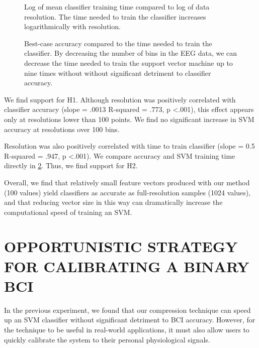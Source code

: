  \begin{figure}[!h]
  \vspace{-0.2cm}
  \centering
   {}
  \caption{Log of mean classifier training time compared to log of data resolution. The time needed to train the classifier increases logarithmically with resolution.}
  \label{fig:fig1b}
  \vspace{-0.1cm}
 \end{figure}

\begin{figure}[!h]
  \vspace{-0.2cm}
  \centering
   {}
  \caption{ Best-case accuracy compared to the time needed to train the classifier. By decreasing the number of bins in the EEG data, we can decrease the time needed to train the support vector machine up to nine times without without significant detriment to classifier accuracy. }
  \label{fig:fig1c}
  \vspace{-0.1cm}
 \end{figure}


We find support for H1. Although resolution was positively correlated with classifier accuracy (slope = .0013 R-squared = .773, p \textless .001), this effect appears only at resolutions lower than 100 points. We find no significant increase in SVM accuracy at resolutions over 100 bins. 

Resolution was also positively correlated with time to train classifier (slope = 0.5 R-squared = .947, p \textless .001). We compare accuracy and SVM training time directly in \ref{fig:fig1c}. Thus, we find support for H2.

Overall, we find that relatively small feature vectors produced with our method (100 values) yield classifiers as accurate as full-resolution samples (1024 values), and that reducing vector size in this way can dramatically increase the computational speed of training an SVM. 

\section{\uppercase{Opportunistic strategy for calibrating a binary BCI}}

In the previous experiment, we found that our compression technique can speed up an SVM classifier without significant detriment to BCI accuracy. However, for the technique to be useful in real-world applications, it must also allow users to quickly calibrate the system to their personal physiological signals.


